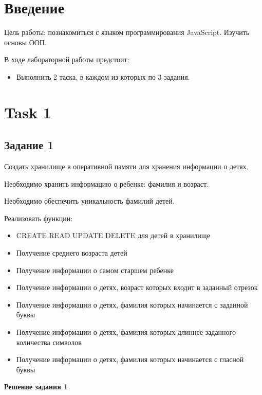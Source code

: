 \documentclass[12pt]{report}
\begin{document}
	\newpage
	\chapter*{Введение}
	Цель работы: познакомиться с языком программирования JavaScript. Изучить основы ООП.\par
	\noindent В ходе лабораторной работы предстоит:
	\begin{itemize}
		\item Выполнить 2 таска, в каждом из которых по 3 задания.
	\end{itemize}
	
	\chapter{Task 1}
	\section{Задание 1}
	\noindent Создать хранилище в оперативной памяти для хранения информации о детях.\par
	\noindent Необходимо хранить информацию о ребенке: фамилия и возраст.\par
	\noindent Необходимо обеспечить уникальность фамилий детей.\par
	\noindent Реализовать функции:
	\begin{itemize}
		\item CREATE READ UPDATE DELETE для детей в хранилище
		\item Получение среднего возраста детей
		\item Получение информации о самом старшем ребенке
		\item Получение информации о детях, возраст которых входит в заданный отрезок
		\item Получение информации о детях, фамилия которых начинается с заданной буквы
		\item Получение информации о детях, фамилия которых длиннее заданного количества символов
		\item Получение информации о детях, фамилия которых начинается с гласной буквы
	\end{itemize}
	\noindent\textbf{Решение задания 1}
\end{document}
